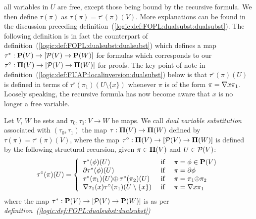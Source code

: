 all variables in $U$ are free, except those being bound by the
recursive formula. We then define $\tau(\pi)$ as
$\tau(\pi)=\tau^{\circ}(\pi)(V)$. More explanations can be found in
the discussion preceding
definition~(\ref{logic:def:FOPL:dualsubst:dualsubst}). The following
definition is in fact the counterpart of
definition~(\ref{logic:def:FOPL:dualsubst:dualsubst}) which defines
a map $\tau^{*}:\mbox{${\bf P}(V)$}\to[{\cal P}(V)\to{\bf P}(W)]$ for formulas which
corresponds to our $\tau^{\circ}:\mbox{${\bf\Pi}(V)$}\to[{\cal P}(V)\to{\bf\Pi}(W)]$
for proofs. The key point of note in
definition~(\ref{logic:def:FUAP:localinversion:dualsubst}) below is
that $\tau^{\circ}(\pi)(U)$ is defined in terms of
$\tau^{\circ}(\pi_{1})(U\setminus\{x\})$ whenever $\pi$ is of the
form $\pi=\mbox{$\nabla$} x\pi_{1}$. Loosely speaking, the recursive formula
has now become aware that $x$ is no longer a free variable.


\begin{defin}\label{logic:def:FUAP:localinversion:dualsubst}
Let $V$, $W$ be sets and $\tau_{0}, \tau_{1}:V\to W$ be maps. We
call {\em dual variable substitution} associated with
$(\tau_{0},\tau_{1})$ the map $\tau:\mbox{${\bf\Pi}(V)$}\to {\bf\Pi}(W)$ defined by
$\tau(\pi)=\tau^{\circ}(\pi)(V)$, where the map
$\tau^{\circ}:\mbox{${\bf\Pi}(V)$}\to[{\cal P}(V)\to{\bf\Pi}(W)]$ is defined by the
following structural recursion, given $\pi\in\mbox{${\bf\Pi}(V)$}$ and $U\in{\cal
P}(V)$:
    \begin{equation}\label{logic:eqn:FUAP:localinversion:dualsubst:1}
                    \tau^{\circ}(\pi)(U)=\left\{
                    \begin{array}{lcl}
                    \tau^{*}(\phi)(U)&\mbox{\ if\ }&\pi=\phi\in\pv\\
                    \axi\tau^{*}(\phi)(U)&\mbox{\ if\ }&\pi=\axi\phi\\
                    \tau^{\circ}(\pi_{1})(U)\pon\,\tau^{\circ}(\pi_{2})(U)
                    &\mbox{\ if\ }&\pi=\pi_{1}\pon\pi_{2}\\
                    \gen \tau_{1}(x)\tau^{\circ}(\pi_{1})(U\setminus\{x\})&\mbox{\ if\ }&\pi=\gen
                    x\pi_{1}\\
                    \end{array}\right.
    \end{equation}
where the map $\tau^{*}:\mbox{${\bf P}(V)$}\to[{\cal P}(V)\to{\bf P}(W)]$ is as per
{\em definition~(\ref{logic:def:FOPL:dualsubst:dualsubst})}
\end{defin}

